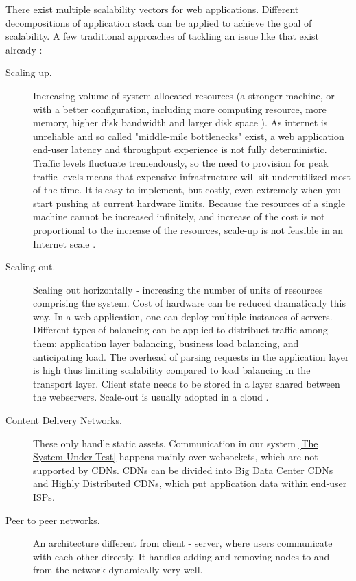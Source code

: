 \documentclass{uvamscse}
\begin{document}
There exist multiple scalability vectors for web applications. Different decompositions of application stack can be applied to achieve the goal of scalability. A few traditional approaches of tackling an issue like that exist already \cite{Akamai}:
\begin{description}
  \item[Scaling up.]
  Increasing volume of system allocated resources (a stronger machine, or with a better configuration, including more computing resource, more memory, higher disk bandwidth and larger disk space \cite{WeiTek}). As internet is unreliable and so called "middle-mile bottlenecks" exist, a web application end-user latency and throughput experience is not fully deterministic. Traffic levels fluctuate tremendously, so the need to provision for peak traffic levels means that expensive infrastructure will sit underutilized most of the time. It is easy to implement, but costly, even extremely when you start pushing at current hardware limits.\cite{Qvef} Because the resources of a single machine cannot be increased infinitely, and increase of the cost is not proportional to the increase of the resources, scale-up is not feasible in an Internet scale \cite{WeiTek}.
  \item[Scaling out.]
  Scaling out horizontally - increasing the number of units of resources comprising the system. Cost of hardware can be reduced dramatically this way. In a web application, one can deploy multiple instances of servers. Different types of balancing can be applied to distribuet traffic among them: application layer balancing, business load balancing, and anticipating load. The overhead of parsing requests in the application layer is high thus limiting scalability compared to load balancing in the transport layer. Client state needs to be stored in a layer shared between the webservers.\cite{Qvef}  Scale-out is usually adopted in a cloud \cite{WeiTek}.
  \item[Content Delivery Networks.]
  These only handle static assets. Communication in our system \ref{The System Under Test} happens mainly over websockets, which are not supported by CDNs. CDNs can be divided into Big Data Center CDNs and Highly Distributed CDNs, which put application data within end-user ISPs.\cite{Akamai}
  \item[Peer to peer networks.]
  An architecture different from client - server, where users communicate with each other directly. It handles adding and removing nodes to and from the network dynamically very well.
\end{description}
\end{document}
